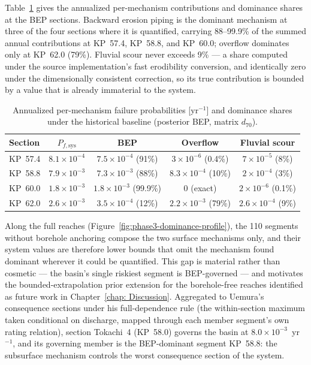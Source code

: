 Table~\ref{tab:phase3-dominance-hist} gives the annualized per-mechanism
contributions and dominance shares at the BEP sections. Backward erosion
piping is the dominant mechanism at three of the four sections where it is
quantified, carrying 88--99.9\% of the summed annual contributions at
KP~57.4, KP~58.8, and KP~60.0; overflow dominates only at KP~62.0 (79\%).
Fluvial scour never exceeds 9\% --- a share computed under the source
implementation's fast erodibility conversion, and identically zero under
the dimensionally consistent correction, so its true contribution is
bounded by a value that is already immaterial to the system.

\begin{table}[htbp]
    \centering
    \caption[Annualized mechanism dominance at the BEP sections,
    historical baseline]{Annualized per-mechanism failure probabilities
    [yr$^{-1}$] and dominance shares under the historical baseline
    (posterior BEP, matrix $d_{70}$).}
    \label{tab:phase3-dominance-hist}
    \begin{tabular}{lcccc}
        \toprule
        Section & $P_{f,\mathrm{sys}}$ & BEP & Overflow & Fluvial scour \\
        \midrule
        KP~57.4 & $8.1\times10^{-4}$ & $7.5\times10^{-4}$ (91\%) & $3\times10^{-6}$ (0.4\%) & $7\times10^{-5}$ (8\%) \\
        KP~58.8 & $7.9\times10^{-3}$ & $7.3\times10^{-3}$ (88\%) & $8.3\times10^{-4}$ (10\%) & $2\times10^{-4}$ (3\%) \\
        KP~60.0 & $1.8\times10^{-3}$ & $1.8\times10^{-3}$ (99.9\%) & 0 (exact) & $2\times10^{-6}$ (0.1\%) \\
        KP~62.0 & $2.6\times10^{-3}$ & $3.5\times10^{-4}$ (12\%) & $2.2\times10^{-3}$ (79\%) & $2.6\times10^{-4}$ (9\%) \\
        \bottomrule
    \end{tabular}
\end{table}

Along the full reaches (Figure~\ref{fig:phase3-dominance-profile}), the
110 segments without borehole anchoring compose the two surface mechanisms
only, and their system values are therefore lower bounds that omit the
mechanism found dominant wherever it could be quantified. This gap is
material rather than cosmetic --- the basin's single riskiest segment is
BEP-governed --- and motivates the bounded-extrapolation prior extension
for the borehole-free reaches identified as future work in
Chapter~\ref{chap: Discussion}. Aggregated to Uemura's consequence
sections under his full-dependence rule (the within-section maximum taken
conditional on discharge, mapped through each member segment's own rating
relation), section Tokachi~4 (KP~58.0) governs the basin at
$8.0\times10^{-3}$~yr$^{-1}$, and its governing member is the BEP-dominant
segment KP~58.8: the subsurface mechanism controls the worst consequence
section of the system.

